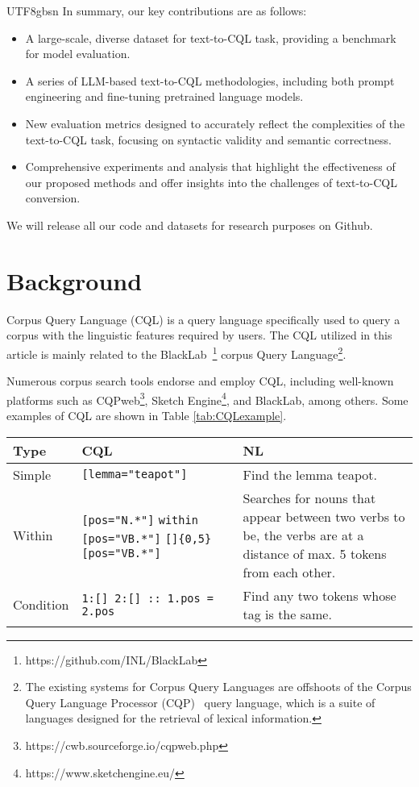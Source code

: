 \documentclass[11pt]{article}
\begin{document}
\begin{CJK*}{UTF8}{gbsn}
In summary, our key contributions are as follows:
\begin{itemize}
    \item A large-scale, diverse dataset for text-to-CQL task, providing a benchmark for model evaluation.
    \item A series of LLM-based text-to-CQL methodologies, including both prompt engineering and fine-tuning pretrained language models.
    \item New evaluation metrics designed to accurately reflect the complexities of the text-to-CQL task, focusing on syntactic validity and semantic correctness.
    \item Comprehensive experiments and analysis that highlight the effectiveness of our proposed methods and offer insights into the challenges of text-to-CQL conversion.
\end{itemize}

We will release all our code and datasets for research purposes on Github.


\section{Background}


 Corpus Query Language (CQL) is a query language specifically used to query a corpus with the linguistic features required by users. The CQL utilized in this article is mainly related to the BlackLab~\citep{blacklab}\footnote{https://github.com/INL/BlackLab} corpus Query Language\footnote{ The existing systems for Corpus Query Languages are offshoots of the Corpus Query Language Processor (CQP)~\citep{hardie2012cqpweb} query language, which is a suite of languages designed for the retrieval of lexical information. 
}. 
 
 Numerous corpus search tools endorse and employ CQL, including well-known platforms such as CQPweb\footnote{https://cwb.sourceforge.io/cqpweb.php}, Sketch Engine\footnote{https://www.sketchengine.eu/}, and BlackLab, among others. Some examples of CQL are shown in Table \ref{tab:CQLexample}.

\begin{table*}
    \centering
    \begin{tabular}{p{5em}p{15em}p{15em}} 
    \hline
    \textbf{Type} & \textbf{CQL} &\textbf{NL} \\
    \hline
    Simple & \verb|[lemma="teapot"]| &Find the lemma teapot.\\
    Within & \verb|[pos="N.*"]| \verb|within| \verb|[pos="VB.*"]| \verb|[]|\verb|{0,5} |\verb|[pos="VB.*"]| & Searches for nouns that appear between two verbs to be, the verbs are at a distance of max. 5 tokens from each other.\\
    Condition & \verb|1:[] 2:[] :: 1.pos = 2.pos| & Find any two tokens whose tag is the same.\\
    \hline
    \end{tabular}
    \caption{Example of the Corpus Query Language. The above examples and explanations are all from the Sketch Engine documentation.}
    \label{tab:CQLexample}
\end{table*}


\end{CJK*}
\end{document}
